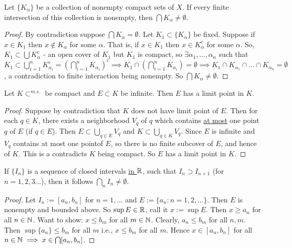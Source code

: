 \documentclass[]{article}
\begin{document}
\begin{theorem}
	Let $\{K_\alpha\}$ be a collection of nonempty compact sets of $X$.
	If every finite intersection of this collection is nonempty, then $\bigcap K_\alpha \neq \emptyset$.
	\label{thm2-36}
\end{theorem}
\begin{proof}
	By contradiction suppose $\bigcap K_\alpha = \emptyset$.
	Let $K_1\subset \{K_\alpha\}$ be fixed. Suppose if $x\in K_1$ then $x\notin K_\alpha$ for some $\alpha$.
	That is, if $x\in K_1$ then $x\in K_\alpha^c$ for some $\alpha$.
	So, $K_1\subset \bigcup K_\alpha^c$ - an open cover of $K_1$ but $K_1$ is compact, so $\exists \alpha_1,\dots,\alpha_n$ such that $K_1\subset \bigcup_{i=1}^n K_{\alpha_i}^c = (\bigcap_{i=1}^n K_{\alpha_i})^c \implies K_1 \cap (\bigcap_{i=1}^n K_{\alpha_i}) = \emptyset \implies K_1\cap K_{\alpha_1}\cap \dots\cap K_{\alpha_n} = \emptyset$, a contradiction to finite interaction being nonempty.
	So $\bigcap K_\alpha \neq \emptyset$.
\end{proof}

\begin{theorem}
	Let $K\subset^{m.s.}$ be compact and $E\subset K$ be infinite.
	Then $E$ has a limit point in $K$.
	\label{thm2-37}
\end{theorem}
\begin{proof}
	Suppose by contradiction that $K$ does not have limit point of $E$.
	Then for each $q\in K$, there exists a neighborhood $V_q$ of $q$ which contains \ul{at most} one point $q$ of $E$ (if $q\in E$).
	Then $E\subset \bigcup_{q\in E} V_q$ and $K\subset \bigcup_{q\in K} V_q$.
	Since $E$ is infinite and $V_q$ contains at most one pointof $E$, so there is no finite subcover of $E$, and hence of $K$. This is a contradicts $K$ being compact.
	So $E$ has a limit point in $K$.
\end{proof}

\begin{theorem}
	If $\{I_n\}$ is a sequence of closed intervals \ul{in $\mathbb{R}$}, such that $I_n\supset I_{n+1}$ (for $n = 1,2,3\dots$), then it follows $\bigcap_n I_n\neq \emptyset$.
	\label{thm2-38}
\end{theorem}
\begin{proof}
	Let $I_n := [a_n,b_n]$ for $n=1,\dots$ and $E:= \{a_n: n = 1,2,\dots\}$.
	Then $E$ is nonempty and bounded above. So $\sup E\in \mathbb{R}$, call it $x:= \sup E$.
	Then $x\geq a_n$ for all $n\in \mathbb{N}$.
	Want to show: $x\leq b_m$ for all $m\in \mathbb{N}$. Clearly, $a_n\leq b_m$ for all $n,m$.
	Then $\sup \{a_n\} \leq b_m$ for all $m$ i.e., $x\leq b_m$ for all $m$.
	Hence $x\in[a_n,b_n]$ for all $n\in\mathbb{N} \implies x\in \bigcap [a_n,b_n]$.
\end{proof}
\end{document}
